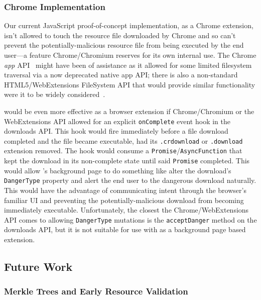 
\subsubsection{Chrome Implementation}

Our current JavaScript proof-of-concept implementation, as a Chrome extension,
isn't allowed to touch the resource file downloaded by Chrome and so can't
prevent the potentially-malicious resource file from being executed by the end
user—a feature Chrome/Chromium reserves for its own internal use. The Chrome
\textit{app} API~\cite{AppAPI} might have been of assistance as it allowed for
some limited filesystem traversal via a now deprecated native app API; there is
also a non-standard HTML5/WebExtensions FileSystem API that would provide
similar functionality were it to be widely considered~\cite{deadSpec}.

\SYSTEM{} would be even more effective as a browser extension if Chrome/Chromium
or the WebExtensions API allowed for an explicit \texttt{onComplete} event hook
in the downloads API. This hook would fire immediately before a file download
completed and the file became executable, \ie had its \texttt{.crdownload} or
\texttt{.download} extension removed. The hook would consume a
\texttt{Promise}/\texttt{AsyncFunction} that kept the download in its
non-complete state until said \texttt{Promise} completed. This would allow
\SYSTEM{}'s background page to do something like alter the download's
\texttt{DangerType} property and alert the end user to the dangerous download
naturally. This would have the advantage of communicating intent through the
browser's familiar UI and preventing the potentially-malicious download from
becoming immediately executable. Unfortunately, the closest the
Chrome/WebExtensions API comes to allowing \texttt{DangerType} mutations is the
\texttt{acceptDanger} method on the downloads API, but it is not suitable for
use with \SYSTEM{} as a background page based extension.

\subsection{Future Work}

\subsubsection{Merkle Trees and Early Resource Validation}


